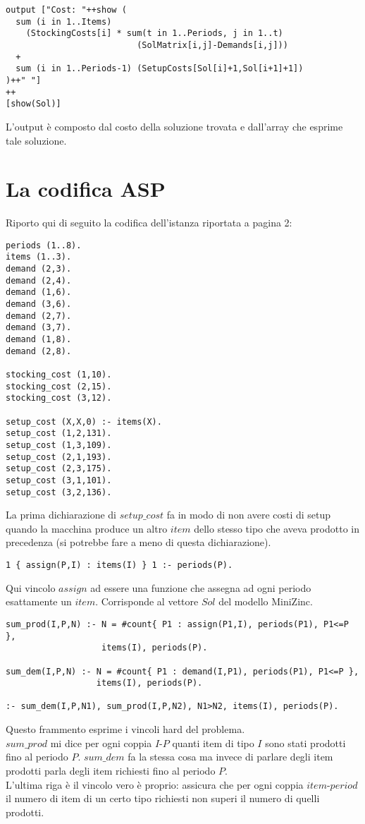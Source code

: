 \documentclass[12pt]{article}
\begin{document}
\begin{verbatim}
output ["Cost: "++show (
  sum (i in 1..Items)
    (StockingCosts[i] * sum(t in 1..Periods, j in 1..t)
                          (SolMatrix[i,j]-Demands[i,j]))
  +
  sum (i in 1..Periods-1) (SetupCosts[Sol[i]+1,Sol[i+1]+1])
)++" "]
++
[show(Sol)]
\end{verbatim}
L'output è composto dal costo della soluzione trovata e dall'array che esprime tale soluzione.
\pagebreak

\section*{La codifica ASP}
Riporto qui di seguito la codifica dell'istanza riportata a pagina 2:
\begin{verbatim}
periods (1..8).
items (1..3).
demand (2,3).
demand (2,4).
demand (1,6).
demand (3,6).
demand (2,7).
demand (3,7).
demand (1,8).
demand (2,8).

stocking_cost (1,10).
stocking_cost (2,15).
stocking_cost (3,12).

setup_cost (X,X,0) :- items(X).
setup_cost (1,2,131).
setup_cost (1,3,109).
setup_cost (2,1,193).
setup_cost (2,3,175).
setup_cost (3,1,101).
setup_cost (3,2,136).
\end{verbatim}
La prima dichiarazione di $setup\_cost$ fa in modo di non avere costi di setup quando la macchina produce un altro $item$ dello stesso tipo che aveva prodotto in precedenza (si potrebbe fare a meno di questa dichiarazione).

\begin{verbatim}
1 { assign(P,I) : items(I) } 1 :- periods(P).
\end{verbatim}
Qui vincolo $assign$ ad essere una funzione che assegna ad ogni periodo esattamente un $item$. Corrisponde al vettore $Sol$ del modello MiniZinc.
\pagebreak

\begin{verbatim}
sum_prod(I,P,N) :- N = #count{ P1 : assign(P1,I), periods(P1), P1<=P },
                   items(I), periods(P).

sum_dem(I,P,N) :- N = #count{ P1 : demand(I,P1), periods(P1), P1<=P },
                  items(I), periods(P).

:- sum_dem(I,P,N1), sum_prod(I,P,N2), N1>N2, items(I), periods(P).
\end{verbatim}
Questo frammento esprime i vincoli hard del problema.\\
$sum\_prod$ mi dice per ogni coppia $I$-$P$ quanti item di tipo $I$ sono stati prodotti fino al periodo $P$. $sum\_dem$ fa la stessa cosa ma invece di parlare degli item prodotti parla degli item richiesti fino al periodo $P$.\\
L'ultima riga è il vincolo vero è proprio: assicura che per ogni coppia $item$-$period$ il numero di item di un certo tipo richiesti non superi il numero di quelli prodotti.
\end{document}
